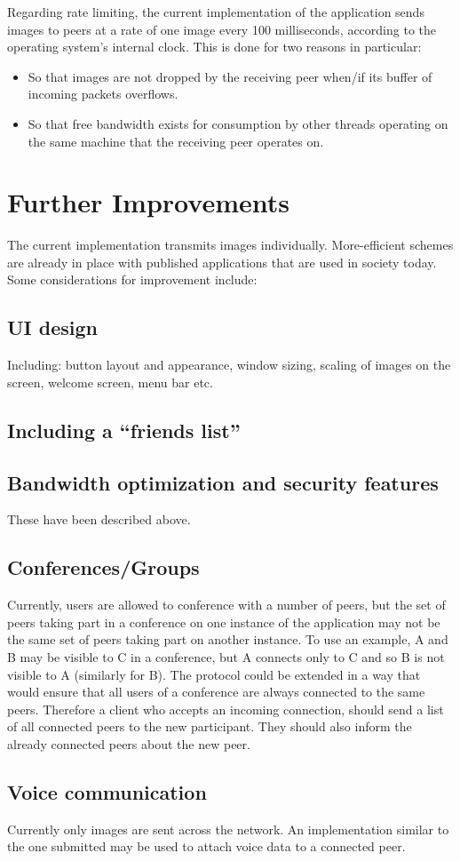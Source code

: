 \documentclass[10pt, a4paper]{article}
\begin{document}
Regarding rate limiting, the current implementation of the application sends images to peers at a rate of one image every 100 milliseconds, according to the operating system's internal clock.
This is done for two reasons in particular:

\begin{itemize}
	\item So that images are not dropped by the receiving peer when/if its buffer of incoming packets overflows.
	\item So that free bandwidth exists for consumption by other threads operating on the same machine that the receiving peer operates on.
\end{itemize}

\section{Further Improvements}

The current implementation transmits images individually.
More-efficient schemes are already in place with published applications that are used in society today.
Some considerations for improvement include:

\subsection{UI design}

Including: button layout and appearance, window sizing, scaling of images on the screen, welcome screen, menu bar etc.

\subsection{Including a ``friends list''}

\subsection{Bandwidth optimization and security features}

These have been described above.

\subsection{Conferences/Groups}

Currently, users are allowed to conference with a number of peers, but the set of peers taking part in a conference on one instance of the application may not be the same set of peers taking part on another instance.
To use an example, A and B may be visible to C in a conference, but A connects only to C and so B is not visible to A (similarly for B).
The protocol could be extended in a way that would ensure that all users of a conference are always connected to the same peers.
Therefore a client who accepts an incoming connection, should send a list of all connected peers to the new participant.
They should also inform the already connected peers about the new peer.

\subsection{Voice communication}

Currently only images are sent across the network.
An implementation similar to the one submitted may be used to attach voice data to a connected peer.

\begingroup
\raggedright



\endgroup
\end{document}
